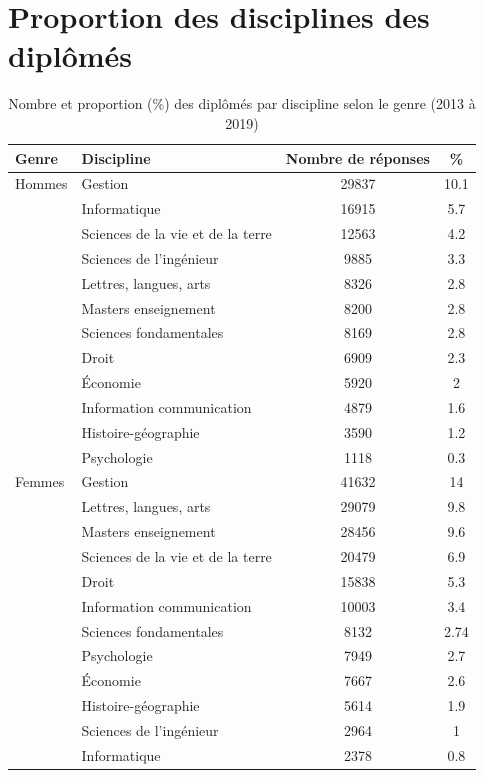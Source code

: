 \documentclass[12pt, a4paper, titlepage, table]{article}
\begin{document}
\section{Proportion des disciplines des diplômés}

	\begin{table}[H]
		\centering
		\begin{tabular}{llcc}
			\toprule
			\textbf{Genre} & \textbf{Discipline} & \textbf{Nombre de réponses} & \textbf{\%} \\
			\midrule
			Hommes & Gestion & 29837 & 10.1 \\
			& Informatique & 16915 & 5.7 \\
			& Sciences de la vie et de la terre & 12563 & 4.2 \\
			& Sciences de l'ingénieur & 9885 & 3.3 \\
			& Lettres, langues, arts & 8326 & 2.8 \\
			& Masters enseignement & 8200 & 2.8 \\
			& Sciences fondamentales & 8169 & 2.8 \\
			& Droit & 6909 & 2.3 \\
			& Économie & 5920 & 2 \\
			& Information communication & 4879 & 1.6 \\
			& Histoire-géographie & 3590 & 1.2 \\
			& Psychologie & 1118 & 0.3 \\
			\midrule
			Femmes & Gestion & 41632 & 14 \\
			& Lettres, langues, arts & 29079 & 9.8 \\
			& Masters enseignement & 28456 & 9.6 \\
			& Sciences de la vie et de la terre & 20479 & 6.9 \\
			& Droit & 15838 & 5.3 \\
			& Information communication & 10003 & 3.4 \\
			& Sciences fondamentales & 8132 & 2.74 \\
			& Psychologie & 7949 & 2.7 \\
			& Économie & 7667 & 2.6 \\
			& Histoire-géographie & 5614 & 1.9 \\
			& Sciences de l'ingénieur & 2964 & 1 \\
			& Informatique & 2378 & 0.8 \\
			\bottomrule
		\end{tabular}
		\caption{Nombre et proportion (\%) des diplômés par discipline selon le genre (2013 à 2019)}
		\label{tab:genre_discipline}
	\end{table}
\end{document}

